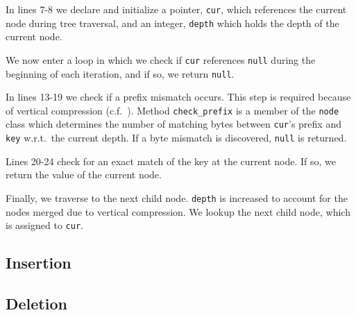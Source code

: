 \documentclass[abstracton,12pt]{scrartcl}
\theoremstyle{definition}
\begin{document}
In lines 7-8 we declare and initialize a pointer, \texttt{cur}, which references the
current node during tree traversal, and an integer, \texttt{depth} which holds the depth
of the current node.

We now enter a loop in which we check if \texttt{cur} references \texttt{null}
during the beginning of each iteration, and if so, we return \texttt{null}.

In lines 13-19 we check if a prefix mismatch occurs. This step is required
because of vertical compression (c.f.\ ).
Method \texttt{check\_prefix} is a member of the \texttt{node} class which
determines the number of matching bytes between \texttt{cur}'s prefix
and \texttt{key} w.r.t.\ the current depth. If a byte mismatch is discovered,
\texttt{null} is returned.

Lines 20-24 check for an exact match of the key at the current node. If so,
we return the value of the current node.

Finally, we traverse to the next child node. \texttt{depth} is increased to
account for the nodes merged due to vertical compression.
We lookup the next child node, which is assigned to \texttt{cur}.

\newpage

\subsection{Insertion}
\label{sec:insertion}

\subsection{Deletion}
\label{sec:deletion}

\newpage



\end{document}
